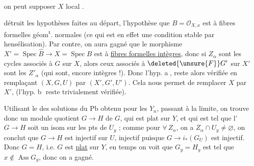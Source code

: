  on peut supposer $X$ local  .
 


détruit les hypothèses  faites au départ,  
l'hypothèse que $B=\mathcal O_{X,x}$ est à fibres formelles
géom\textsuperscript{t}. normales (ce qui est en effet une
condition stable par hensélisation). Par contre,
on aura gagné que le morphisme $X'=\operatorname{Spec}\widehat B\to X=\operatorname{Spec}B$ est
à \uline{fibres formelles  intègres}, donc si $Z_\alpha$ sont les
cycles associés à $G$ sur $X$,  alors  ceux
associés à $\deleted{\unsure{F}}G'$ sur $X'$ sont les $Z'_\alpha$ (qui sont,
encore intègres !). Donc l'hyp. \textcircled{a},  reste alors vérifiée
en remplaçant $(X,G,U)$ par $(X',G',U')$. Cela nous
permet de remplacer $X$ par $X'$, (l'hyp. \textcircled{b} reste
trivialement vérifiée).

Utilisant le  des solutions
du Pb obtenu pour les $Y_n$,  passant à la
limite, on trouve donc un module quotient
$G\to H$ de $G$, qui est plat sur $Y$,  et qui est
tel que l' $G\to H$ soit  un isom sur les
pts de $U_y$ ; comme pour $\forall\,Z_\alpha$, on a $Z_\alpha\cap U_y\ne\varnothing$,
on conclut que $G\to H$ est injectif sur $U$, 
injectif puisque $G\to i_*(G_U)$ est injectif. Donc
$G=H$, i.e. $G$ est \uline{plat} sur $Y$, en \unsure{$=$} temps on
voit que $G_y=H_y$ est tel que $x\notin\operatorname{Ass}G_y$, donc
on a gagné.

